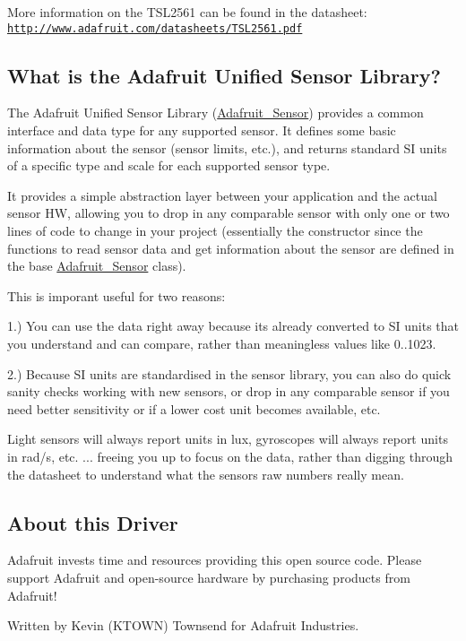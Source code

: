 More information on the T\+S\+L2561 can be found in the datasheet\+: \href{http://www.adafruit.com/datasheets/TSL2561.pdf}{\tt http\+://www.\+adafruit.\+com/datasheets/\+T\+S\+L2561.\+pdf}

\subsection*{What is the Adafruit Unified Sensor Library?}

The Adafruit Unified Sensor Library (\hyperlink{class_adafruit___sensor}{Adafruit\+\_\+\+Sensor}) provides a common interface and data type for any supported sensor. It defines some basic information about the sensor (sensor limits, etc.), and returns standard SI units of a specific type and scale for each supported sensor type.

It provides a simple abstraction layer between your application and the actual sensor HW, allowing you to drop in any comparable sensor with only one or two lines of code to change in your project (essentially the constructor since the functions to read sensor data and get information about the sensor are defined in the base \hyperlink{class_adafruit___sensor}{Adafruit\+\_\+\+Sensor} class).

This is imporant useful for two reasons\+:

1.) You can use the data right away because it\textquotesingle{}s already converted to SI units that you understand and can compare, rather than meaningless values like 0..1023.

2.) Because SI units are standardised in the sensor library, you can also do quick sanity checks working with new sensors, or drop in any comparable sensor if you need better sensitivity or if a lower cost unit becomes available, etc.

Light sensors will always report units in lux, gyroscopes will always report units in rad/s, etc. ... freeing you up to focus on the data, rather than digging through the datasheet to understand what the sensor\textquotesingle{}s raw numbers really mean.

\subsection*{About this Driver}

Adafruit invests time and resources providing this open source code. Please support Adafruit and open-\/source hardware by purchasing products from Adafruit!

Written by Kevin (K\+T\+O\+WN) Townsend for Adafruit Industries. 